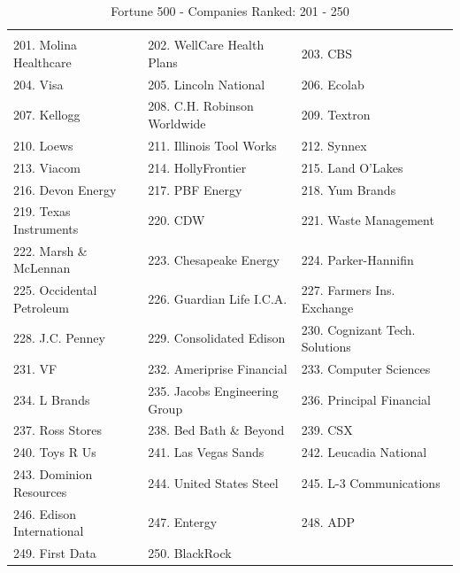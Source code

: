 \documentclass{book}
\begin{document}
\begin{table}[H]
\centering
\caption{Fortune 500 - Companies Ranked: 201 - 250}
\begin{tabular}{lll}
\hline
 \\ 201. Molina Healthcare 
&  202. WellCare Health Plans 
&  203. CBS 
\\ 204. Visa 
&  205. Lincoln National 
&  206. Ecolab 
\\ 207. Kellogg 
&  208. C.H. Robinson Worldwide 
&  209. Textron 
\\ 210. Loews 
&  211. Illinois Tool Works 
&  212. Synnex 
\\ 213. Viacom 
&  214. HollyFrontier 
&  215. Land O'Lakes 
\\ 216. Devon Energy 
&  217. PBF Energy 
&  218. Yum Brands 
\\ 219. Texas Instruments 
&  220. CDW 
&  221. Waste Management 
\\ 222. Marsh \& McLennan 
&  223. Chesapeake Energy 
&  224. Parker-Hannifin 
\\ 225. Occidental Petroleum 
&  226. Guardian Life I.C.A. 
&  227. Farmers Ins. Exchange 
\\ 228. J.C. Penney 
&  229. Consolidated Edison 
&  230. Cognizant Tech. Solutions 
\\ 231. VF 
&  232. Ameriprise Financial 
&  233. Computer Sciences 
\\ 234. L Brands 
&  235. Jacobs Engineering Group 
&  236. Principal Financial 
\\ 237. Ross Stores 
&  238. Bed Bath \& Beyond 
&  239. CSX 
\\ 240. Toys R Us 
&  241. Las Vegas Sands 
&  242. Leucadia National 
\\ 243. Dominion Resources 
&  244. United States Steel 
&  245. L-3 Communications 
\\ 246. Edison International 
&  247. Entergy 
&  248. ADP 
\\ 249. First Data 
&  250. BlackRock 
&   
 \\ \hline

\end{tabular}
\end{table}
\end{document}
